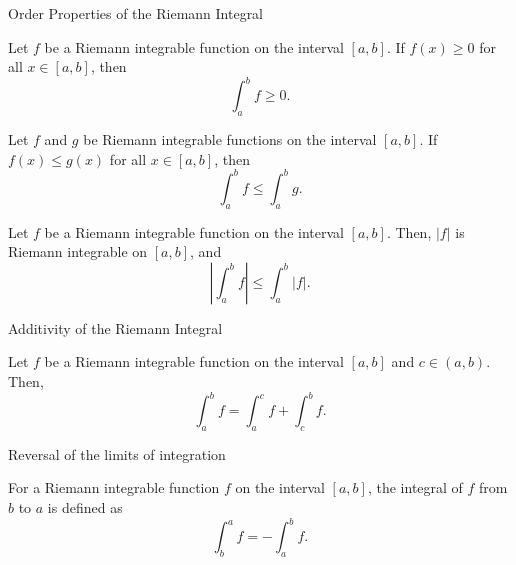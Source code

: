 \documentclass[12pt,a4paper]{article}
\begin{document}
\clearpage

\begin{heading}
    Order Properties of the Riemann Integral
\end{heading}

\vspace{10pt}

\begin{theorem}
    Let $f$ be a Riemann integrable function on the interval $[a,b]$. If $f(x) \geq 0$ for all $x \in [a,b]$, then
    \[
        \int_a^b f \geq 0.
    \]
\end{theorem}

\clearpage

\begin{theorem}
    Let $f$ and $g$ be Riemann integrable functions on the interval $[a,b]$. If $f(x) \leq g(x)$ for all $x \in [a,b]$, then
    \[
        \int_a^b f \leq \int_a^b g.
    \]
\end{theorem}

\clearpage

\begin{theorem}
    Let $f$ be a Riemann integrable function on the interval $[a,b]$. Then, $|f|$ is Riemann integrable on $[a,b]$, and
    \[
        \left| \int_a^b f \right| \leq \int_a^b |f|.
    \]
\end{theorem}

\clearpage

\begin{heading}
    Additivity of the Riemann Integral
\end{heading}

\vspace{10pt}

\begin{theorem}[Additivity]
    Let $f$ be a Riemann integrable function on the interval $[a,b]$ and $c \in (a,b)$. Then,
    \[
        \int_a^b f = \int_a^c f + \int_c^b f.
    \]
\end{theorem}

\clearpage

\begin{heading}
    Reversal of the limits of integration
\end{heading}

\begin{definition}
    For a Riemann integrable function $f$ on the interval $[a,b]$, the integral of $f$ from $b$ to $a$ is defined as
    \[
        \int_b^a f = - \int_a^b f .
    \]
\end{definition}
\end{document}
